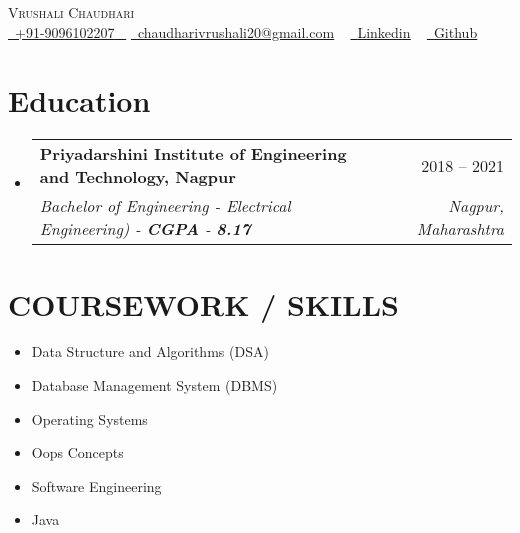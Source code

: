 \documentclass[letterpaper,11pt]{article}
\makeatletter
\newcommand{\resumeSubheading}[4]{
  \vspace{-1pt}\item
    \begin{tabular*}{0.97\textwidth}[t]{l@{\extracolsep{\fill}}r}
      \textbf{#1} & #2 \\
      \textit{\small#3} & \textit{\small #4} \\
    \end{tabular*}\vspace{-5pt}
}
\newcommand{\resumeSubHeadingListStart}{\begin{itemize}[leftmargin=*]}
\newcommand{\resumeSubHeadingListEnd}{\end{itemize}}
\makeatother
\begin{document}
\begin{center}
    {\Huge \scshape Vrushali Chaudhari} \\ \vspace{1pt}
   \small \href{tel:}{ \raisebox{-0.1\height}\faPhone\ \underline{+91-9096102207} ~} \href{mailto:chaudharivrushali20@gmail.com}{\raisebox{-0.2\height}\faEnvelope\  \underline{chaudharivrushali20@gmail.com}} ~ 
    \href{https://www.linkedin.com/in/vrushali-chaudhari-b161301a1/}{\raisebox{-0.2\height}\faLinkedinSquare\ \underline{Linkedin}}  ~
    \href{https://github.com/Vru2614}{\raisebox{-0.2\height}\faGithub\ \underline{Github}} ~
   
\end{center}
 \vspace{0.5mm}


\section{Education}
  \resumeSubHeadingListStart
    \resumeSubheading
        {Priyadarshini Institute of Engineering and Technology, Nagpur}{2018 – 2021}
      {Bachelor of Engineering - Electrical Engineering) - \textbf{CGPA} - \textbf{8.17}}{Nagpur, Maharashtra}
  \resumeSubHeadingListEnd
  

\section{COURSEWORK / SKILLS}
        \begin{multicols}{4}
            \begin{itemize}[itemsep=-2pt, parsep=5pt]
                \item Data Structure and Algorithms (DSA)
                \item Database Management System (DBMS)
                \item Operating Systems
                \item Oops Concepts
                \item Software Engineering
                \item Java
            \end{itemize}
        \end{multicols}
        \vspace*{2.0\multicolsep}
\end{document}
